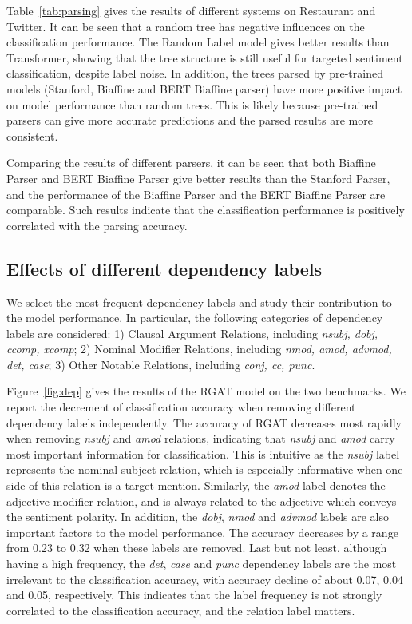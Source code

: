 \documentclass[journal]{IEEEtran}
\begin{document}
	Table~\ref{tab:parsing} gives the results of different systems on Restaurant and Twitter.
	It can be seen that a random tree has negative influences on the classification performance.
	The Random Label model gives better results than Transformer, showing that the tree structure is still useful for targeted sentiment classification, despite label noise.
	In addition, the trees parsed by pre-trained models (Stanford, Biaffine and BERT Biaffine parser) have more positive impact on model performance than random trees.
	This is likely because pre-trained parsers can give more accurate predictions and the parsed results are more consistent.
	
	Comparing the results of different parsers, it can be seen that both Biaffine Parser and BERT Biaffine Parser give better results than the Stanford Parser, and the performance of the Biaffine Parser and the BERT Biaffine Parser are comparable. 
	Such results indicate that the classification performance is positively correlated with the parsing accuracy.
	
	\subsection{Effects of different dependency labels}
	We select the most frequent dependency labels and study their contribution to the model performance.
	In particular, the following categories of dependency labels are considered: 1) Clausal Argument Relations, including \textit{nsubj, dobj, ccomp, xcomp}; 2) Nominal Modifier Relations, including \textit{nmod, amod, advmod, det, case}; 3) Other Notable Relations, including \textit{conj, cc, punc}.
	
	Figure~\ref{fig:dep} gives the results of the RGAT model on the two benchmarks.
	We report the decrement of classification accuracy when removing different dependency labels independently.
	The accuracy of RGAT decreases most rapidly when removing \textit{nsubj} and \textit{amod} relations, indicating that \textit{nsubj} and \textit{amod} carry most important information  for classification. 
	This is intuitive as the \textit{nsubj} label represents the nominal subject relation, which is especially informative when one side of this relation is a target mention.
	Similarly, the \textit{amod} label denotes the adjective modifier relation, and is always related to the adjective which conveys the sentiment polarity.
	In addition, the \textit{dobj}, \textit{nmod} and \textit{advmod} labels are also important factors to the model performance. The accuracy decreases by a range from 0.23 to 0.32 when these labels are removed. 
	Last but not least, although having a high frequency, the \textit{det}, \textit{case} and \textit{punc} dependency labels are the most irrelevant to the classification accuracy, with accuracy decline of about 0.07, 0.04 and 0.05, respectively.
	This indicates that the label frequency is not strongly correlated to the classification accuracy, and the relation label matters.
	
\end{document}
